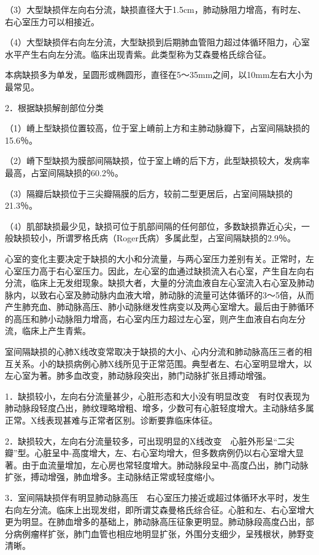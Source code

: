 （3）大型缺损伴左向右分流，缺损直径大于1.5cm，肺动脉阻力增高，有时左、右心室压力可以相接近。

（4）大型缺损伴右向左分流，大型缺损到后期肺血管阻力超过体循环阻力，心室水平产生右向左分流。临床出现青紫。此类型称为艾森曼格氏综合征。

本病缺损多为单发，呈圆形或椭圆形，直径在5～35mm之间，以10mm左右大小为最常见。

2．根据缺损解剖部位分类

（1）嵴上型缺损位置较高，位于室上嵴前上方和主肺动脉瓣下，占室间隔缺损的15.6％。

（2）嵴下型缺损为膜部间隔缺损，位于室上嵴的后下方，此型缺损较大，发病率最高，占室间隔缺损的60.2％。

（3）隔瓣后缺损位于三尖瓣隔膜的后方，较前二型更居后，占室间隔缺损的21.3％。

（4）肌部缺损最少见，缺损可位于肌部间隔的任何部位，多数缺损靠近心尖，一般缺损较小，所谓罗格氏病（Roger氏病）多属此型，占室间隔缺损的2.9％。

心室的变化主要决定于缺损的大小和分流量，与两心室压力差别有关。正常时，左心室压力高于右心室压力。因此，左心室的血通过缺损流入右心室，产生自左向右分流，临床上无发绀现象。缺损大者，大量的分流血液自左心室流入右心室及肺动脉内，以致右心室及肺动脉内血液大增，肺动脉的流量可达体循环的3～5倍，从而产生肺充血、肺动脉高压、肺小动脉继发性病变以及两心室增大。最后由于肺循环的高压和肺小动脉阻力增高，右心室内压力超过左心室，则产生血液自右向左分流，临床上产生青紫。

室间隔缺损的心肺X线改变常取决于缺损的大小、心内分流和肺动脉高压三者的相互关系。小的缺损病例心肺X线所见于正常范围。典型者左、右心室明显增大，以左心室为著。肺多血改变，肺动脉段突出，肺门动脉扩张且搏动增强。

1．缺损较小，左向右分流量甚少，心脏形态和大小没有明显改变　有时仅表现为肺动脉段轻度凸出，肺纹理略增粗、增多，少数可有心脏轻度增大。主动脉结多属正常。X线表现甚难与正常者区别。诊断要靠临床体征。

2．缺损较大，左向右分流量较多，可出现明显的X线改变　心脏外形呈“二尖瓣”型。心脏呈中-高度增大，左、右心室均增大，但多数病例仍以右心室增大显著。由于血流量增加，左心房也常轻度增大。肺动脉段呈中-高度凸出，肺门动脉扩张，搏动增强，肺血增多。主动脉结正常或轻度缩小。

3．室间隔缺损伴有明显肺动脉高压　右心室压力接近或超过体循环水平时，发生右向左分流。临床上出现发绀，即所谓艾森曼格氏综合征。心脏和左、右心室增大更为明显。在肺血增多的基础上，肺动脉高压征象更明显。肺动脉段高度凸出，部分病例瘤样扩张，肺门血管也相应地明显扩张，外围分支细少，呈残根状，肺野变清晰。

